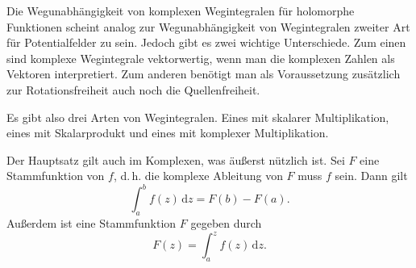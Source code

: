 \documentclass[a4paper,11pt,fleqn,twocolumn,twoside]{scrartcl}
\numberwithin{equation}{section}
\begin{document}
Die Wegunabhängigkeit von komplexen Wegintegralen für holomorphe
Funktionen scheint analog zur Wegunabhängigkeit von Wegintegralen
zweiter Art für Potentialfelder zu sein. Jedoch gibt es zwei wichtige
Unterschiede. Zum einen sind komplexe Wegintegrale vektorwertig, wenn
man die komplexen Zahlen als Vektoren interpretiert. Zum anderen
benötigt man als Voraussetzung zusätzlich zur Rotationsfreiheit
auch noch die Quellenfreiheit.

Es gibt also drei Arten von Wegintegralen. Eines mit skalarer
Multiplikation, eines mit Skalarprodukt und eines mit komplexer
Multiplikation.

Der Hauptsatz gilt auch im Komplexen, was äußerst
nützlich ist. Sei $F$ eine Stammfunktion von $f$, d.\,h. die
komplexe Ableitung von $F$ muss $f$ sein. Dann gilt
\begin{equation}
\int_a^b f(z)\,\mathrm dz = F(b)-F(a).
\end{equation}
Außerdem ist eine Stammfunktion $F$ gegeben durch
\begin{equation}
F(z) = \int_a^z f(z)\,\mathrm dz.
\end{equation}
\end{document}
